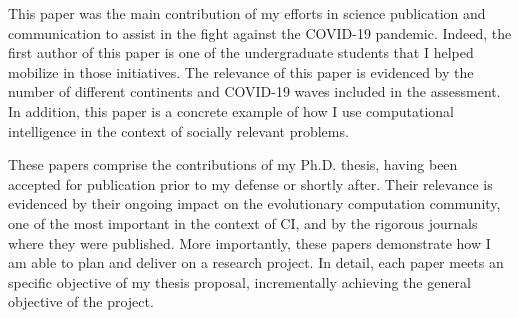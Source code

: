 \documentclass[11pt,a4paper,sans]{moderncv} %
\begin{document}
{This paper was the main contribution of my efforts in science publication and communication to assist in the fight against the COVID-19 pandemic. Indeed, the first author of this paper is one of the undergraduate students that I helped mobilize in those initiatives. The relevance of this paper is evidenced by the number of different continents and COVID-19 waves included in the assessment. In addition, this paper is a concrete example of how I use computational intelligence in the context of socially relevant problems. }

\cvline{}{\hrule}
{}
{}
{These papers comprise the contributions of my Ph.D. thesis, having been accepted for publication prior to my defense or shortly after. Their relevance is evidenced by their ongoing impact on the evolutionary computation community, one of the most important in the context of CI, and by the rigorous journals where they were published. More importantly, these papers demonstrate how I am able to plan and deliver on a research project. In detail, each paper meets an specific objective of my thesis proposal, incrementally achieving the general objective of the project.}  



\end{document}
